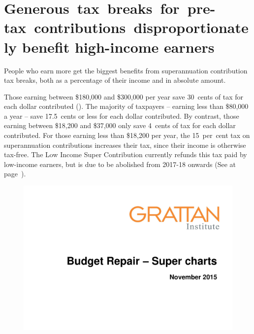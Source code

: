 \section{\mbox{Generous tax breaks for pre-tax contributions disproportionately} benefit high-income earners}
People who earn more get the biggest benefits from superannuation contribution tax breaks, both as a percentage of their income and in absolute amount. 

Those earning between \$180,000 and \$300,000 per year save 30~cents of tax for each dollar contributed ().  The majority of taxpayers – earning less than \$80,000 a year – save 17.5~cents or less for each dollar contributed. By contrast, those earning between \$18,200 and \$37,000 only save 4~cents of tax for each dollar contributed.  For those earning less than \$18,200 per year, the 15~per~cent tax on superannuation contributions increases their tax, since their income is otherwise tax-free. The Low Income Super Contribution currently refunds this tax paid by low-income earners, but is due to be abolished from 2017-18 onwards (See  at page~\pageref{sec:SUPER-LISC-to-be-abolished}).

\begin{figure}
\label{fig:SUPER-4-2}
\includegraphics[width=\columnwidth,page=20]{super-atlas/PPTX.pdf}

\end{figure}

